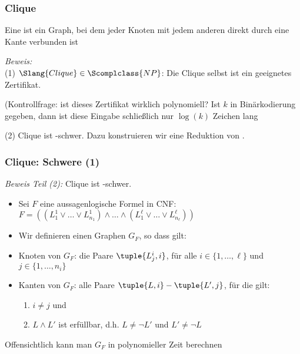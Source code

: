 \documentclass[aspectratio=1610,onlymath]{beamer}
\begin{document}
\begin{frame}\frametitle{Clique}

Eine  ist ein Graph, bei dem jeder Knoten mit jedem anderen
direkt durch eine Kante verbunden ist\medskip

\medskip\pause

\pause

\emph{Beweis:}\\
(1) $\Slang{Clique}\in\Scomplclass{NP}$: Die Clique selbst ist ein geeignetes Zertifikat.\\[1ex] {\tiny(Kontrollfrage: ist dieses Zertifikat wirklich polynomiell? Ist $k$ in Binärkodierung gegeben, dann ist diese Eingabe schließlich nur $\log(k)$ Zeichen lang \ghost{\ldots)}\pause

}\medskip

(2) Clique ist -schwer. Dazu konstruieren wir eine Reduktion von .

\end{frame}

\begin{frame}\frametitle{Clique: Schwere (1)}

\emph{Beweis Teil (2):} Clique ist -schwer.
\begin{itemize}
\item Sei $F$ eine aussagenlogische Formel in CNF:\\
$F=\left((L^1_1\vee \ldots\vee L^1_{n_1})\wedge \ldots\wedge (L^\ell_1\vee \ldots\vee L^\ell_{n_\ell})\right)$\pause
%
\item Wir definieren einen Graphen $G_F$, so dass gilt:\\[1ex]
\pause
%
\item \alert{Knoten von $G_F$:} die Paare $\tuple{L^i_j,i}$, für alle $i\in\{1,\ldots,\ell\}$ und $j\in\{1,\ldots,n_i\}$\pause
%
\item \alert{Kanten von $G_F$:} alle Paare $\tuple{L,i}-\tuple{L',j}$, für die gilt:
\begin{enumerate}[(1)]
\item $i\neq j$ und
\item $L\wedge L'$ ist erfüllbar, d.h. $L\neq \neg L'$ und $L'\neq \neg L$
\end{enumerate}
\end{itemize}
Offensichtlich kann man $G_F$ in polynomieller Zeit berechnen

\end{frame}
\end{document}
